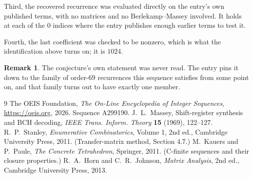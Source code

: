 \documentclass[11pt,a4paper]{article}
\theoremstyle{plain}
\theoremstyle{definition}
\newtheorem{remark}[theorem]{Remark}
\begin{document}
Third, the recovered recurrence was evaluated directly on the entry's own published terms, with
no matrices and no Berlekamp--Massey involved. It holds at each of the $0$ indices where
the entry publishes enough earlier terms to test it.

Fourth, the last coefficient was checked to be nonzero, which is what the identification above
turns on; it is $1024$.

\begin{remark}
The conjecture's own statement was never read. The entry pins it down to the family of
order-$69$ recurrences this sequence satisfies from some point on, and that family turns
out to have exactly one member.
\end{remark}

\begin{thebibliography}{9}
 The OEIS Foundation, \emph{The On-Line Encyclopedia of Integer
Sequences}, \url{https://oeis.org}, 2026. Sequence A299190.
 J.~L.~Massey, Shift-register synthesis and BCH decoding, \emph{IEEE
Trans. Inform. Theory} \textbf{15} (1969), 122--127.
 R.~P.~Stanley, \emph{Enumerative Combinatorics}, Volume 1, 2nd ed.,
Cambridge University Press, 2011. (Transfer-matrix method, Section 4.7.)
 M.~Kauers and P.~Paule, \emph{The Concrete Tetrahedron}, Springer, 2011.
(C-finite sequences and their closure properties.)
 R.~A.~Horn and C.~R.~Johnson, \emph{Matrix Analysis}, 2nd ed., Cambridge
University Press, 2013.
\end{thebibliography}
\end{document}
